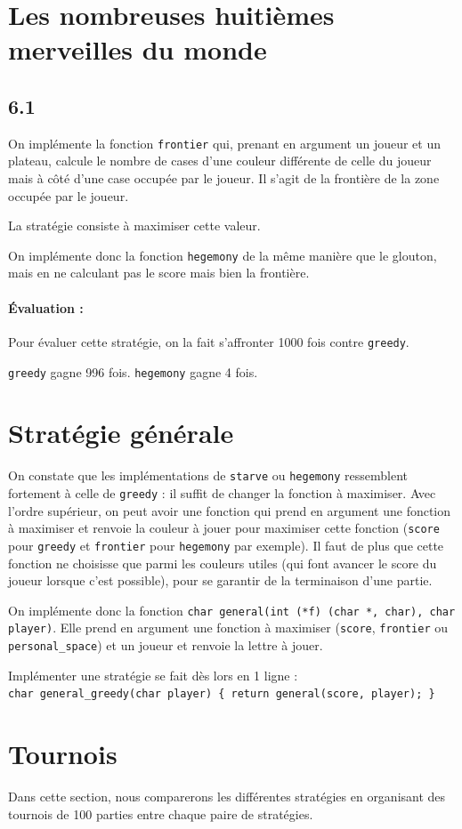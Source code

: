 \documentclass[12pt]{article}
\def\question#1{\subsection{#1}}
\def\sec#1{\section{#1}}
\begin{document}
\sec{Les nombreuses huitièmes merveilles du monde}

\question{6.1}
On implémente la fonction \texttt{frontier} qui, prenant en argument un joueur et un plateau, calcule le nombre de cases d'une couleur différente de celle du joueur mais à côté d'une case occupée par le joueur. 
Il s'agit de la frontière de la zone occupée par le joueur.

La stratégie consiste à maximiser cette valeur.

On implémente donc la fonction \texttt{hegemony} de la même manière que le glouton, mais en ne calculant pas le score mais bien la frontière.



\paragraph{Évaluation :}
Pour évaluer cette stratégie, on la fait s'affronter 1000 fois contre \texttt{greedy}.

\texttt{greedy} gagne 996 fois. \texttt{hegemony} gagne 4 fois. 

\sec{Stratégie générale} 
On constate que les implémentations de \texttt{starve} ou \texttt{hegemony} ressemblent fortement à celle de \texttt{greedy} : il suffit de changer la fonction à maximiser. Avec l'ordre supérieur, on peut avoir une fonction qui prend en argument une fonction à maximiser et renvoie la couleur à jouer pour maximiser cette fonction (\texttt{score} pour \texttt{greedy} et \texttt{frontier} pour \texttt{hegemony} par exemple). Il faut de plus que cette fonction ne choisisse que parmi les couleurs utiles (qui font avancer le score du joueur lorsque c'est possible), pour se garantir de la terminaison d'une partie.

On implémente donc la fonction \texttt{char general(int (*f) (char *, char), char player)}. Elle prend en argument une fonction à maximiser (\texttt{score}, \texttt{frontier} ou \texttt{personal\_space}) et un joueur et renvoie la lettre à jouer. 

Implémenter une stratégie se fait dès lors en 1 ligne :\\
\texttt{char general\_greedy(char player) \{ return general(score, player); \}}


\sec{Tournois}
Dans cette section, nous comparerons les différentes stratégies en organisant des tournois de 100 parties entre chaque paire de stratégies.\\
\end{document}
